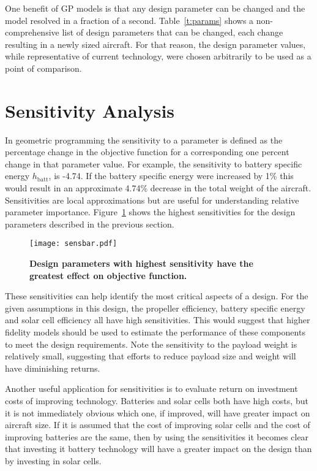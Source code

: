 \documentclass[]{aiaa-tc}%
\begin{document}
One benefit of GP models is that any design parameter can be changed and the model resolved in a fraction of a second.  
Table~\ref{t:params} shows a non-comprehensive list of design parameters that can be changed, each change resulting in a newly sized aircraft. 
For that reason, the design parameter values, while representative of current technology, were chosen arbitrarily to be used as a point of comparison.

\section{Sensitivity Analysis}

In geometric programming the sensitivity to a parameter is defined as the percentage change in the objective function for a corresponding one percent change in that parameter value.  
For example, the sensitivity to battery specific energy $h_{\mathrm{batt}}$, is -4.74.  If the battery specific energy were increased by 1\% this would result in an approximate 4.74\% decrease in the total weight of the aircraft.  
Sensitivities are local approximations but are useful for understanding relative parameter importance.  
Figure~\ref{f:sensbar} shows the highest sensitivities for the design parameters described in the previous section. 

\begin{figure}[h!]
	\begin{center}
	\texttt{[image: sensbar.pdf]}
    \caption{\textbf{Design parameters with highest sensitivity have the greatest effect on objective function. }}
	\label{f:sensbar}
	\end{center}
\end{figure}


These sensitivities can help identify the most critical aspects of a design. 
For the given assumptions in this design, the propeller efficiency, battery specific energy and solar cell efficiency all have high sensitivities. 
This would suggest that higher fidelity models should be used to estimate the performance of these components to meet the design requirements. 
Note the sensitivity to the payload weight is relatively small, suggesting that efforts to reduce payload size and weight will have diminishing returns. 

Another useful application for sensitivities is to evaluate return on investment costs of improving technology.  
Batteries and solar cells both have high costs, but it is not immediately obvious which one, if improved, will have greater impact on aircraft size.  
If it is assumed that the cost of improving solar cells and the cost of improving batteries are the same, then by using the sensitivities it becomes clear that investing it battery technology will have a greater impact on the design than by investing in solar cells. 
\end{document}
